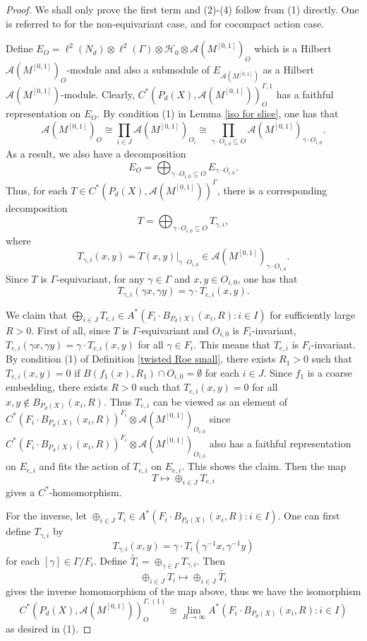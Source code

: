 \documentclass[11pt]{article}
\theoremstyle{definition}
\theoremstyle{plain}
\def\A{\mathcal A}\def\C{\mathcal C}\def\B{\mathcal B}\def\E{\mathcal E}\def\O{\mathcal O}\def\h{\mathfrak h}\def\K{\mathcal K}\def\F{\mathcal F}\def\P{\mathcal P}\def\L{\mathcal L}\def\R{\mathcal R}\def\Q{\mathcal Q}\def\H{\mathcal H}\def\S{\mathcal S}\def\N{\mathcal N}\def\U{\mathcal U}\def\V{\mathcal V}
\def\ox{\otimes}
\def\ox{\otimes}
\def\Ga{\Gamma}
\begin{document}
\begin{proof}
We shall only prove the first term and (2)-(4) follow from (1) directly. One is referred to \cite[Lemma 6.4]{Yu2000} for the non-equivariant case, \cite[Proposition 12.9]{GHT2000} and \cite[Lemma 3.1]{GW2022} for cocompact action case.


Define $E_O=\ell^2(N_d)\ox\ell^2(\Ga)\ox\H_0\ox\A(M^{[0,1]})_O$ which is a Hilbert $\A(M^{[0,1]})_O$-module and also a submodule of $E_{\A(M^{[0,1]})}$ as a Hilbert $\A(M^{[0,1]})$-module. Clearly, $C^*(P_d(X),\A(M^{[0,1]}))^{\Ga,1}_{O}$ has a faithful representation on $E_O$. By condition (1) in Lemma \ref{iso for slice}, one has that
$$\A(M^{[0,1]})_{O}\cong\prod_{i\in J}\A(M^{[0,1]})_{O_i}\cong\prod_{\gamma\cdot O_{i,0}\subseteq O}\A(M^{[0,1]})_{\gamma\cdot O_{i,0}}.$$
As a result, we also have a decomposition
$$E_O=\bigoplus_{\gamma\cdot O_{i,0}\subseteq O}E_{\gamma\cdot O_{i,0}}.$$
Thus, for each $T\in C^*(P_d(X),\A(M^{[0,1]}))^{\Ga}$, there is a corresponding decomposition
$$T=\bigoplus_{\gamma\cdot O_{i,0}\subseteq O}T_{\gamma,i},$$
where
$$T_{\gamma,i}(x,y)=T(x,y)|_{\gamma\cdot O_{i,0}}\in\A(M^{[0,1]})_{\gamma\cdot O_{i,0}}.$$
Since $T$ is $\Ga$-equivariant, for any $\gamma\in\Ga$ and $x,y\in O_{i,0}$, one has that
$$T_{\gamma,i}(\gamma x,\gamma y)=\gamma\cdot T_{e,i}(x,y).$$

We claim that $\bigoplus_{i\in J}T_{e,i}\in A^*(F_i\cdot B_{P_d(X)}(x_i,R):i\in I)$ for sufficiently large $R>0$. First of all, since $T$ is $\Ga$-equivariant and $O_{i,0}$ is $F_i$-invariant, $T_{e,i}(\gamma x,\gamma y)=\gamma\cdot T_{e,i}(x,y)$ for all $\gamma\in F_i$. This means that $T_{e,i}$ is $F_i$-invariant.
By condition (1) of Definition \ref{twisted Roe small}, there exists $R_1>0$ such that $T_{e, i}(x,y)=0$ if $B(f_1(x), R_1)\cap O_{i,0}=\emptyset$ for each $i\in J$. Since $f_1$ is a coarse embedding, there exists $R>0$ such that $T_{e,i}(x,y)=0$ for all $x,y\notin B_{P_d(X)}(x_i,R)$. Thus $T_{e,i}$ can be viewed as an element of $C^*(F_i\cdot B_{P_d(X)}(x_i,R))^{F_i}\ox\A(M^{[0,1]})_{O_{i,0}}$ since $C^*(F_i\cdot B_{P_d(X)}(x_i,R))^{F_i}\ox\A(M^{[0,1]})_{O_{i,0}}$ also has a faithful representation on $E_{e,i}$ and fits the action of $T_{e,i}$ on $E_{e,i}$. This shows the claim. Then the map
$$T\mapsto \oplus_{i\in J}T_{e,i}$$
gives a $C^*$-homomorphism.

For the inverse, let $\oplus_{i\in J}T_i\in A^*(F_i\cdot B_{P_d(X)}(x_i,R):i\in I)$. One can first define $T_{\gamma,i}$ by 
$$T_{\gamma,i}(x,y)=\gamma\cdot T_i(\gamma^{-1}x,\gamma^{-1}y)$$
for each $[\gamma]\in\Ga/F_i$. Define $\widetilde{T_i}=\oplus_{\gamma\in \Ga}T_{\gamma,i}$. Then
$$\oplus_{i\in J}T_i\mapsto \oplus_{i\in J}\widetilde{T_i}$$
gives the inverse homomorphism of the map above, thus we have the isomorphism
$$C^*(P_d(X),\A(M^{[0,1]}))^{\Ga,(1)}_O\cong\lim\limits_{R\to\infty} A^*(F_i\cdot B_{P_d(X)}(x_i,R):i\in I)$$
as desired in (1).
\end{proof}
\end{document}
